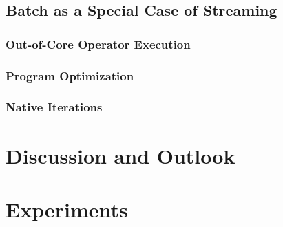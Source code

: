 \documentclass[11pt]{article}
\begin{document}
	\subsection{Batch as a Special Case of Streaming}
		\subsubsection{Out-of-Core Operator Execution}
		\subsubsection{Program Optimization}
		\subsubsection{Native Iterations}

\section{Discussion and Outlook}
\section{Experiments}


\cite{DBLP:conf/hotcloud/ZahariaCFSS10}




\end{document}
